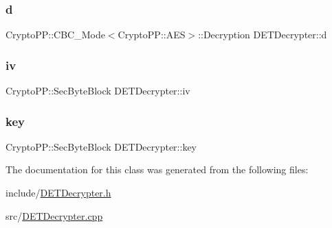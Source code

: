 \subsubsection{\texorpdfstring{d}{d}}
{\footnotesize\ttfamily Crypto\+P\+P\+::\+C\+B\+C\+\_\+\+Mode$<$Crypto\+P\+P\+::\+A\+ES$>$\+::Decryption D\+E\+T\+Decrypter\+::d\hspace{0.3cm}{\ttfamily [private]}}

\mbox{\label{classDETDecrypter_a601eb88318e103fd40ad1864f951ab54}} 
\subsubsection{\texorpdfstring{iv}{iv}}
{\footnotesize\ttfamily Crypto\+P\+P\+::\+Sec\+Byte\+Block D\+E\+T\+Decrypter\+::iv\hspace{0.3cm}{\ttfamily [private]}}

\mbox{\label{classDETDecrypter_a44a998e051bc9efc04295b9401ec716e}} 
\subsubsection{\texorpdfstring{key}{key}}
{\footnotesize\ttfamily Crypto\+P\+P\+::\+Sec\+Byte\+Block D\+E\+T\+Decrypter\+::key\hspace{0.3cm}{\ttfamily [private]}}



The documentation for this class was generated from the following files\+:\begin{DoxyCompactItemize}
\item 
include/\hyperlink{DETDecrypter_8h}{D\+E\+T\+Decrypter.\+h}\item 
src/\hyperlink{DETDecrypter_8cpp}{D\+E\+T\+Decrypter.\+cpp}\end{DoxyCompactItemize}
